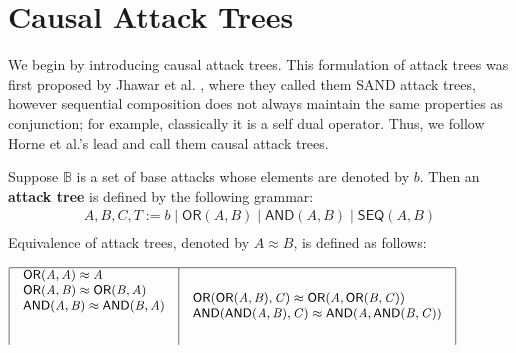 \documentclass{llncs}
\newcommand{\ATermsnt}[1]{\mathit{#1}}
\newcommand{\ATermsmv}[1]{\mathit{#1}}
\begin{document}
\section{Causal Attack Trees}
\label{sec:causal_attack_trees}
We begin by introducing causal attack trees.  This formulation of
attack trees was first proposed by Jhawar et al. \cite{Jhawar:2015},
where they called them SAND attack trees, however sequential
composition does not always maintain the same properties as
conjunction; for example, classically it is a self dual operator.
Thus, we follow Horne et al.'s lead \cite{horne2017semantics} and call
them causal attack trees.
\begin{definition}
  \label{def:atrees}
  Suppose $\mathbb{B}$ is a set of base attacks whose elements are
  denoted by $\ATermsmv{b}$.  Then an \textbf{attack tree} is defined by
  the following grammar:
  \[
  \begin{array}{lll}
    \ATermsnt{A},\ATermsnt{B},\ATermsnt{C},\ATermsnt{T} := \ATermsmv{b} \mid  \mathsf{OR}( \ATermsnt{A} , \ATermsnt{B} )  \mid  \mathsf{AND}( \ATermsnt{A} , \ATermsnt{B} )  \mid  \mathsf{SEQ}( \ATermsnt{A} , \ATermsnt{B} ) \\
  \end{array}
  \]
  \noindent
  Equivalence of attack trees, denoted by $ \ATermsnt{A}  \approx  \ATermsnt{B} $, is defined as
  follows:
  \begin{center}
    \begin{math} \footnotesize
      \begin{array}{|l|l|}
        \hline
        \begin{array}{lll}
            \mathsf{OR}( \ATermsnt{A} , \ATermsnt{A} )   \approx  \ATermsnt{A} \\
            \mathsf{OR}( \ATermsnt{A} , \ATermsnt{B} )   \approx   \mathsf{OR}( \ATermsnt{B} , \ATermsnt{A} )  \\
            \mathsf{AND}( \ATermsnt{A} , \ATermsnt{B} )   \approx   \mathsf{AND}( \ATermsnt{B} , \ATermsnt{A} )  \\
          \\\\
        \end{array}
        &
        \begin{array}{lll}          
            \mathsf{OR}(  \mathsf{OR}( \ATermsnt{A} , \ATermsnt{B} )  , \ATermsnt{C} )   \approx   \mathsf{OR}( \ATermsnt{A} ,  \mathsf{OR}( \ATermsnt{B} , \ATermsnt{C} )  )  \\
            \mathsf{AND}(  \mathsf{AND}( \ATermsnt{A} , \ATermsnt{B} )  , \ATermsnt{C} )   \approx   \mathsf{AND}( \ATermsnt{A} ,  \mathsf{AND}( \ATermsnt{B} , \ATermsnt{C} )  )  \\

\end{array}
\end{array}
\end{math}
\end{center}
\end{definition}
\end{document}
